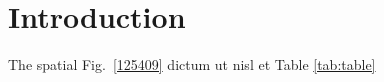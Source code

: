 \section{Introduction}
\label{introduction}

The spatial  Fig.~\ref{125409} dictum ut nisl et Table \ref{tab:table}
